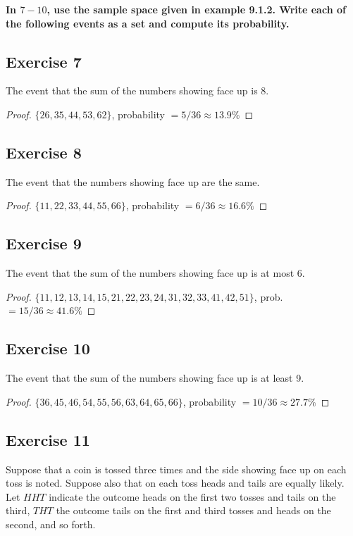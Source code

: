 \documentclass[14pt]{extarticle}
\newcommand{\cy}{\color{cyan}}
\begin{document}
{\bf \cy In $7-10$, use the sample space given in example 9.1.2. Write each of the following events as a set and
compute its probability.}

\subsection{Exercise 7}
The event that the sum of the numbers showing face up is 8.

\begin{proof}
     \(\{26, 35, 44, 53, 62\}\), probability \(= 5/36 \approx 13.9\%\)
\end{proof}

\subsection{Exercise 8}
The event that the numbers showing face up are the same.

\begin{proof}
     \(\{11, 22, 33, 44, 55, 66\}\), probability \(= 6/36 \approx 16.6\%\)
\end{proof}

\subsection{Exercise 9}
The event that the sum of the numbers showing face up is at most 6.

\begin{proof}
     \(\{11, 12, 13, 14, 15, 21, 22, 23, 24, 31, 32, 33, 41, 42, 51\}\), prob. \(= 15/36 \approx 41.6\%\)
\end{proof}

\subsection{Exercise 10}
The event that the sum of the numbers showing face up is at least 9.

\begin{proof}
     \(\{36, 45, 46, 54, 55, 56, 63, 64, 65, 66\}\), probability \(= 10/36 \approx 27.7\%\)
\end{proof}

\subsection{Exercise 11}
Suppose that a coin is tossed three times and the side showing face up on each toss is noted. Suppose also that on
each toss heads and tails are equally likely. Let \(HHT\) indicate the outcome heads on the first two tosses and
tails on the third, \(THT\) the outcome tails on the first and third tosses and heads on the second, and so forth.
\end{document}
